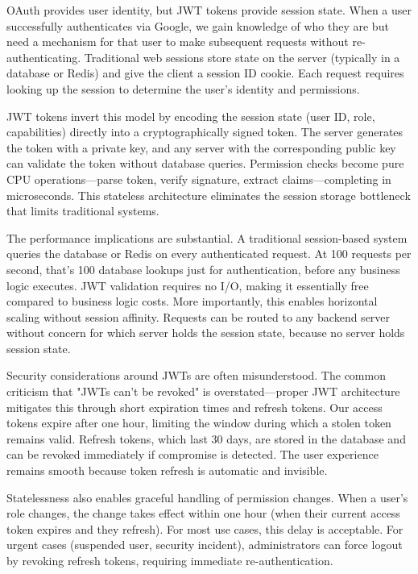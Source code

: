 \documentclass[12pt,a4paper]{article}
\begin{document}
OAuth provides user identity, but JWT tokens provide session state. When a user successfully authenticates via Google, we gain knowledge of who they are but need a mechanism for that user to make subsequent requests without re-authenticating. Traditional web sessions store state on the server (typically in a database or Redis) and give the client a session ID cookie. Each request requires looking up the session to determine the user's identity and permissions.

JWT tokens invert this model by encoding the session state (user ID, role, capabilities) directly into a cryptographically signed token. The server generates the token with a private key, and any server with the corresponding public key can validate the token without database queries. Permission checks become pure CPU operations—parse token, verify signature, extract claims—completing in microseconds. This stateless architecture eliminates the session storage bottleneck that limits traditional systems.

The performance implications are substantial. A traditional session-based system queries the database or Redis on every authenticated request. At 100 requests per second, that's 100 database lookups just for authentication, before any business logic executes. JWT validation requires no I/O, making it essentially free compared to business logic costs. More importantly, this enables horizontal scaling without session affinity. Requests can be routed to any backend server without concern for which server holds the session state, because no server holds session state.

Security considerations around JWTs are often misunderstood. The common criticism that "JWTs can't be revoked" is overstated—proper JWT architecture mitigates this through short expiration times and refresh tokens. Our access tokens expire after one hour, limiting the window during which a stolen token remains valid. Refresh tokens, which last 30 days, are stored in the database and can be revoked immediately if compromise is detected. The user experience remains smooth because token refresh is automatic and invisible.

Statelessness also enables graceful handling of permission changes. When a user's role changes, the change takes effect within one hour (when their current access token expires and they refresh). For most use cases, this delay is acceptable. For urgent cases (suspended user, security incident), administrators can force logout by revoking refresh tokens, requiring immediate re-authentication.
\end{document}
